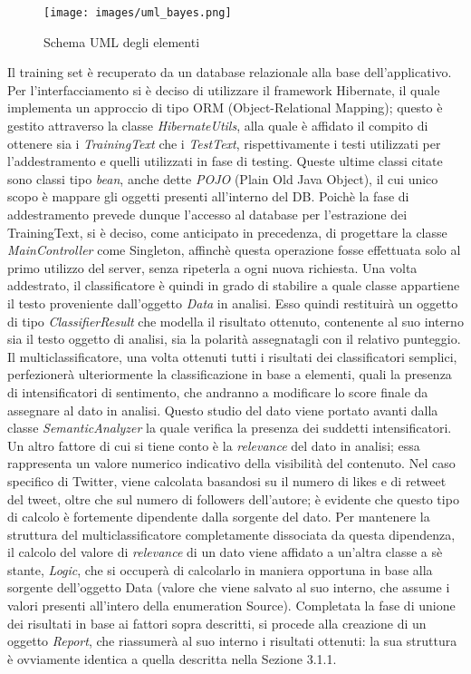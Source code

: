 \begin{figure}[h]
    \centering
    \texttt{[image: images/uml\_bayes.png]}
    \caption{Schema UML degli elementi }
    \label{fig:uml_bayes}
\end{figure}

Il training set è recuperato da un database relazionale alla base dell'applicativo. Per l'interfacciamento si è deciso di utilizzare il framework Hibernate, il quale implementa un approccio di tipo ORM (Object-Relational Mapping); questo è gestito attraverso la classe \textit{HibernateUtils}, alla quale è affidato il compito di ottenere sia i \textit{TrainingText} che i \textit{TestText}, rispettivamente i testi utilizzati per l'addestramento e quelli utilizzati in fase di testing. Queste ultime classi citate sono classi tipo \textit{bean}, anche dette \textit{POJO} (Plain Old Java Object), il cui unico scopo è mappare gli oggetti presenti all'interno del DB. Poichè la fase di addestramento prevede dunque l'accesso al database per l'estrazione dei TrainingText, si è deciso, come anticipato in precedenza, di progettare la classe \textit{MainController} come Singleton, affinchè questa operazione fosse effettuata solo al primo utilizzo del server, senza ripeterla a ogni nuova richiesta. \newline 
Una volta addestrato, il classificatore è quindi in grado di stabilire a quale classe appartiene il testo proveniente dall'oggetto \textit{Data} in analisi. Esso quindi restituirà un oggetto di tipo \textit{ClassifierResult} che modella il risultato ottenuto, contenente al suo interno sia il testo oggetto di analisi, sia la polarità assegnatagli con il relativo punteggio. \newline
Il multiclassificatore, una volta ottenuti tutti i risultati dei classificatori semplici, perfezionerà ulteriormente la classificazione in base a elementi, quali la presenza di intensificatori di sentimento, che andranno a modificare lo score finale da assegnare al dato in analisi. Questo studio del dato viene portato avanti dalla classe \textit{SemanticAnalyzer} la quale verifica la presenza dei suddetti intensificatori. Un altro fattore di cui si tiene conto è la \textit{relevance} del dato in analisi; essa rappresenta un valore numerico indicativo della visibilità del contenuto. Nel caso specifico di Twitter, viene calcolata basandosi su il numero di likes e di retweet del tweet, oltre che sul numero di followers dell'autore; è evidente che questo tipo di calcolo è fortemente dipendente dalla sorgente del dato. Per mantenere la struttura del multiclassificatore completamente dissociata da questa dipendenza, il calcolo del valore di \textit{relevance} di un dato viene affidato a un'altra classe a sè stante, \textit{Logic}, che si occuperà di calcolarlo in maniera opportuna in base alla sorgente dell'oggetto Data (valore che viene salvato al suo interno, che assume i valori presenti all'intero della enumeration Source). \newline
Completata la fase di unione dei risultati in base ai fattori sopra descritti, si procede alla creazione di un oggetto \textit{Report}, che riassumerà al suo interno i risultati ottenuti: la sua struttura è ovviamente identica a quella descritta nella Sezione 3.1.1. 

